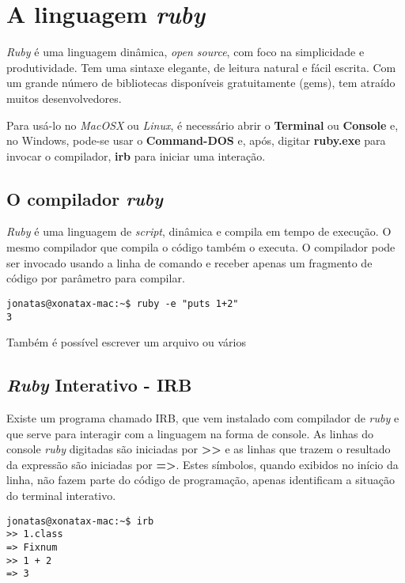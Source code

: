 \documentclass[espaco=simples,appendix=Name]{abnt}
\begin{document}
\chapter { A linguagem \textit{ruby} }

\textit{Ruby} é uma linguagem dinâmica, \textit{open source}, com foco na simplicidade e produtividade. Tem uma sintaxe elegante, de leitura natural e fácil escrita. Com um grande número de bibliotecas disponíveis gratuitamente (gems), tem atraído muitos desenvolvedores.

Para usá-lo no \textit{MacOSX} ou \textit{Linux}, é necessário abrir o \textbf{Terminal} ou \textbf{Console} e, no Windows, pode-se usar o \textbf{Command-DOS} e, após, digitar \textbf{ruby.exe} para invocar o compilador, \textbf{irb} para iniciar uma interação.


\section { O compilador \textit{ruby} }

\textit{Ruby} é uma linguagem de \textit{script}, dinâmica e compila em tempo de execução. O mesmo compilador que compila o código também o executa. O compilador pode ser invocado usando a linha de comando e receber apenas um fragmento de código por parâmetro para compilar.

\begin{lstlisting}[caption=Usando o compilador na linha de comando]
jonatas@xonatax-mac:~$ ruby -e "puts 1+2"
3
\end{lstlisting}

Também é possível escrever um arquivo ou vários

\section { \textit{Ruby} Interativo - IRB }

Existe um programa chamado IRB, que vem instalado com compilador de \textit{ruby} e que serve para interagir com a linguagem na forma de console. As linhas do console \textit{ruby} digitadas são iniciadas por \textbf{>>} e as linhas que trazem o resultado da expressão são iniciadas por \textbf{=>}. Estes símbolos, quando exibidos no início da linha, não fazem parte do código de programação, apenas identificam a situação do terminal interativo.

\begin{lstlisting}[caption=Usando o compilador na linha de comando]
jonatas@xonatax-mac:~$ irb
>> 1.class
=> Fixnum
>> 1 + 2
=> 3
\end{lstlisting}
\end{document}
